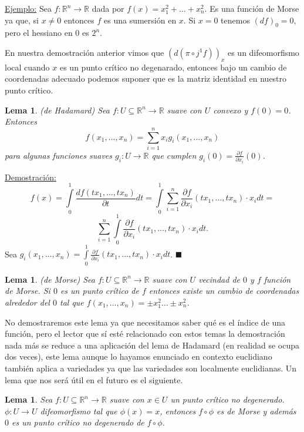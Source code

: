 \documentclass{report}
\newtheorem{lem}[theorem]{Lema}
\theoremstyle{definition}
\begin{document}
\underline{Ejemplo:} Sea $f: \mathbb{R}^n \to \mathbb{R}$ dada por $f(x) = x_1^2 + \dots + x_n^2$. Es una funci\'on de Morse ya que, si $x \neq 0$ entonces $f$ es una sumersi\'on en $x$. Si $x = 0$ tenemos $(df)_{0} = 0$, pero el hessiano en $0$ es $2^n$. 

En nuestra demostraci\'on anterior vimos que $(d(\pi \circ j^1 f))_x$ es un difeomorfismo local cuando $x$ es un punto cr\'itico no degenarado, entonces bajo un cambio de coordenadas adecuado podemos suponer que es la matriz identidad en nuestro punto cr\'itico. 

\begin{lem}
(de Hadamard) Sea $f: U \subseteq \mathbb{R}^n \to \mathbb{R}$ suave con $U$ convexo y $f(0)=0$. Entonces $$f (x_1, \dots , x_n) =\sum\limits_{i=1}^n x_i g_i (x_1 , \dots , x_n)$$ para algunas funciones suaves $g_i : U \to \mathbb{R}$ que cumplen $g_i (0) = \frac{\partial f}{\partial x_i} (0)$.
\end{lem}
\underline{Demostraci\'on:} $$f(x) = \int\limits_0^1 \frac{df (t x_1 , \dots , t x_n)}{\partial t} dt = \int\limits_0^1 \sum\limits_{i=1}^n \frac{\partial f}{\partial x_i} (t x_1 , \dots , t x_n) \cdot x_i dt = $$
 $$\sum\limits_{i=1}^n \int\limits_0^1 \frac{\partial f}{\partial x_i} (t x_1 , \dots , t x_n) \cdot x_i dt .$$
Sea $g_i (x_1 , \dots , x_n) = \int\limits_0^1 \frac{\partial f}{\partial x_i} (t x_1 , \dots , t x_n) \cdot x_i dt$. $\blacksquare$

\begin{lem}
(de Morse) Sea $f: U \subseteq \mathbb{R}^n \to \mathbb{R}$ suave con $U$ vecindad de $0$ y $f$ funci\'on de Morse. Si $0$ es un punto cr\'itico de $f$ entonces existe un cambio de coordenadas alrededor del $0$ tal que $f(x_1 , \dots , x_n) =  \pm x_1^2 \dots \pm x_n^2 $.
\end{lem}

No demostraremos este lema ya que necesitamos saber qu\'e es el \'indice de una funci\'on, pero el lector que s\'i est\'e relacionado con estos temas la demostraci\'on nada m\'as se reduce a una aplicaci\'on del lema de Hadamard (en realidad se ocupa dos veces), este lema aunque lo hayamos enunciado en contexto euclidiano tambi\'en aplica a variedades ya que las variedades son localmente euclidianas. Un lema que nos ser\'a \'util en el futuro es el siguiente.


\begin{lem}
Sea $f: U \subseteq \mathbb{R}^n \to \mathbb{R}$ suave con $x \in U$ un punto cr\'itico no degenerado. $\phi: U \to U$ difeomorfismo tal que $\phi (x) = x$, entonces $f  \circ \phi$ es de Morse y adem\'as $0$ es un punto cr\'itico no degenerado de $f \circ \phi$.
\end{lem}
\end{document}
